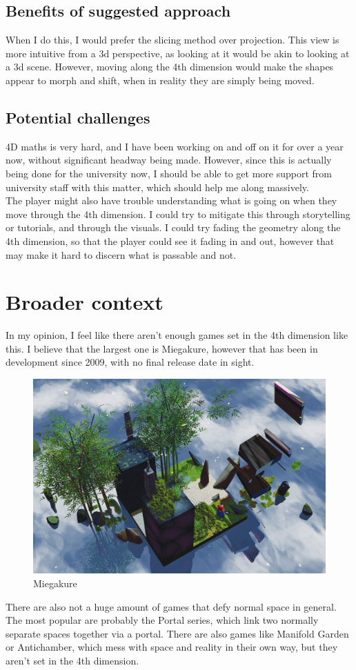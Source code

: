 \documentclass[12pt]{article}
\begin{document}
\subsection{Benefits of suggested approach}
When I do this, I would prefer the slicing method over projection. 
This view is more intuitive from a 3d perspective, as looking at it would be akin to looking at a 3d scene. 
However, moving along the 4th dimension would make the shapes appear to morph and shift, when in reality they are simply being moved.

\subsection{Potential challenges}
4D maths is very hard, and I have been working on and off on it for over a year now, without significant headway being made. 
However, since this is actually being done for the university now, I should be able to get more support from university staff with this matter, which should help me along massively.\\
The player might also have trouble understanding what is going on when they move through the 4th dimension. I could try to mitigate this through storytelling or tutorials, and through the visuals.
I could try fading the geometry along the 4th dimension, so that the player could see it fading in and out, however that may make it hard to discern what is passable and not.

\section{Broader context}
In my opinion, I feel like there aren't enough games set in the 4th dimension like this.
I believe that the largest one is Miegakure, however that has been in development since 2009, with no final release date in sight.\\
\begin{figure}
    \centering
    \includegraphics[width=\textwidth]{Media/Miegakure.png}
    \caption{Miegakure}
\end{figure}
There are also not a huge amount of games that defy normal space in general. The most popular are probably the Portal series, which link two normally separate spaces together via a portal.
There are also games like Manifold Garden or Antichamber, which mess with space and reality in their own way, but they aren't set in the 4th dimension.
\end{document}
